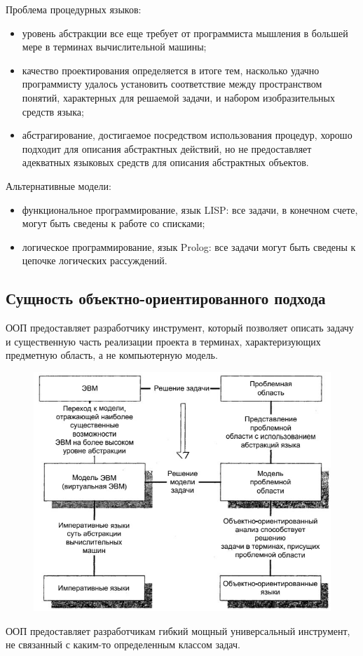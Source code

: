 \documentclass{beamer}
\begin{document}
\begin{frame}
Проблема процедурных языков:
\begin{itemize}
\item уровень абстракции все еще требует от программиста мышления в большей мере в терминах вычислительной машины;
\item качество проектирования определяется в итоге тем, насколько удачно программисту удалось установить соответствие между пространством понятий, характерных для решаемой задачи, и набором изобразительных средств языка;
\item абстрагирование, достигаемое посредством использования процедур, хорошо
подходит для описания абстрактных действий, но не предоставляет адекватных языковых средств для описания абстрактных объектов.
\end{itemize}
Альтернативные модели:
\begin{itemize}
\item функциональное программирование, язык LISP: все задачи, в конечном счете, могут быть сведены к работе со списками;
\item логическое программирование, язык Prolog: все задачи могут быть сведены к цепочке логических рассуждений.
\end{itemize}
\end{frame}

\subsection{Сущность объектно-ориентированного подхода}

\begin{frame}[t]
ООП предоставляет разработчику инструмент, который позволяет описать задачу и существенную часть реализации проекта в терминах, характеризующих предметную область, а не компьютерную модель. 
\begin{figure}[h]
\centering
\includegraphics[scale=0.4]{images/lec04-pic02.png}
\end{figure}
ООП предоставляет разработчикам гибкий мощный универсальный инструмент, не связанный с каким-то определенным классом задач.
\end{frame}
\end{document}
